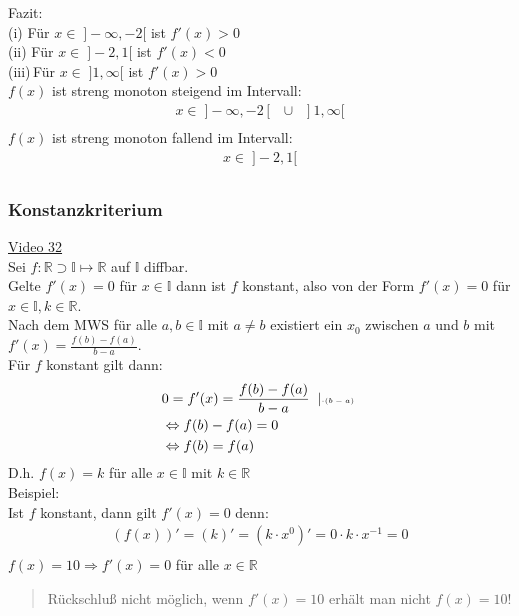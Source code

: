 Fazit:\\
(i)\;\,\,Für $ x\in \;]-\infty,-2[ $ ist $ f'(x) >0$\\
(ii) Für $ x\in \;]-2,1[ $ ist $ f'(x) <0$\\
(iii)\,Für $ x\in \;]1,\infty[ $ ist $ f'(x) >0$\vspace*{4mm}\\
$f(x) $ ist streng monoton steigend im Intervall:\\
\begin{align*}
x\in\;]-\infty,-2[\;\;\cup\;\;]1,\infty[\\
\end{align*}
$f(x) $ ist streng monoton fallend im Intervall:\\
\begin{align*}
x\in\;]-2,1[\\
\end{align*}
\subsubsection{Konstanzkriterium}
\href{https://youtu.be/SUuhqlbPbGI}{Video 32}\\
Sei $f:\mathbb{R}\supset \mathbb{I}\longmapsto \mathbb{R}$ auf $ \mathbb{I} $ diffbar.\\
Gelte $f'(x)=0$ für $x\in\mathbb{I}  $ dann ist $ f $ konstant, also von der Form $ f'(x)=0 $ für $ x\in \mathbb{I}, k\in\mathbb{R} $.\vspace*{2mm}\\
Nach dem MWS für alle $ a,b\in \mathbb{I} $ mit $ a\neq b $ existiert ein $ x_0 $ zwischen $ a $ und $ b $ mit $ f'(x)=\frac{f(b)-f(a)}{b-a} $.\vspace*{4mm}\\
Für $f$ konstant gilt dann:\\
\begin{align*}
&0=f'(x)=\frac{f(b)-f(a)}{b-a}\;\;|\text{\tiny $\cdot (b-a)$ } \\
&\Leftrightarrow f(b)-f(a)=0\\
&\Leftrightarrow f(b)=f(a)\\
\end{align*}
D.h. $ f(x)=k $ für alle $ x\in\mathbb{I} $ mit $ k\in \mathbb{R} $\vspace*{4mm}\\
Beispiel:\\
\textbullet\;\;Ist $ f $ konstant, dann gilt $ f'(x)=0 $ denn:\\
\begin{align*}
(f(x))'=(k)'=(k\cdot x^0)'=0\cdot k\cdot x^{-1}=0\\
\end{align*}
\textbullet\;\;$ f(x)=10\Rightarrow f'(x)=0 $ für alle $ x\in\mathbb{R} $\\
\begin{quote}
	Rückschluß nicht möglich, wenn $ f'(x)=10 $ erhält man nicht $ f(x) =10$!\\
\end{quote}
